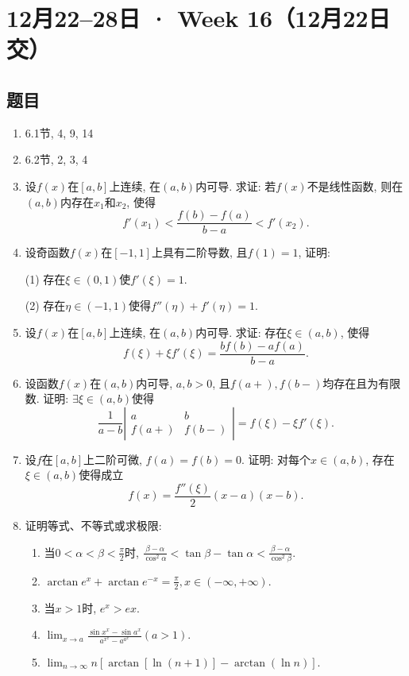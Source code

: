 \documentclass[UTF8,11pt, a4paper, oneside, fontset=none]{ctexbook}
\begin{document}
\section{12月22--28日 · Week 16（12月22日交）}
\subsection*{题目}
\begin{enumerate}

\item 6.1节, 4, 9, 14

\item 6.2节, 2, 3, 4

\item 设$f(x)$在$[a, b]$上连续, 在$(a, b)$内可导. 求证: 若$f(x)$不是线性函数, 则在$(a, b)$内存在$x_1$和$x_2$, 使得
\[
f'(x_1) < \frac{f(b) - f(a)}{b-a} < f'(x_2).
\]

\item 设奇函数$f(x)$在$[-1, 1]$上具有二阶导数, 且$f(1) =1$, 证明:

(1) 存在$\xi \in (0, 1)$使$f'(\xi) =1$.

(2) 存在$\eta \in (-1, 1)$使得$f''(\eta) + f'(\eta) =1$.

\item 设$f(x)$在$[a, b]$上连续, 在$(a, b)$内可导. 求证: 存在$\xi \in (a, b)$, 使得
\[
f(\xi) + \xi f'(\xi) = \frac{bf(b) - af(a)}{b-a}.
\]

\item 设函数$f(x)$在$(a, b)$内可导, $a, b >0$, 且$f(a+), f(b-)$均存在且为有限数. 证明: $\exists \xi \in (a, b)$使得
\[
\frac{1}{a - b}  \left| 
\begin{array}{cc}
a & b \\
f(a+) & f(b-) 
\end{array}
\right| = f(\xi) - \xi f'(\xi).
\]

\item 设$f$在$[a, b]$上二阶可微, $f(a) = f(b) = 0$. 证明: 对每个$x \in (a, b)$, 存在$\xi \in (a, b)$使得成立
\[
f(x) = \frac{f''(\xi)}{2} (x-a)(x-b).
\]

\item 证明等式、不等式或求极限:
\begin{enumerate}
\item 当$0 < \alpha < \beta < \frac{\pi}{2}$时, $\frac{\beta - \alpha}{\cos^2 \alpha} < \tan \beta - \tan \alpha < \frac{\beta - \alpha}{\cos^2 \beta}$.

\item $\arctan e^x + \arctan e^{-x} = \frac{\pi}{2}, x \in (-\infty, +\infty)$.

\item 当$x>1$时, $e^x > e x$.

\item $\lim_{x \to a} \frac{\sin x^x - \sin a^x}{a^{x^x} - a^{a^x}} (a > 1)$.

\item $\lim_{n \to \infty} n[\arctan[\ln(n+1)] - \arctan (\ln n)]$.

\end{enumerate}

\end{enumerate}
\clearpage
\end{document}
